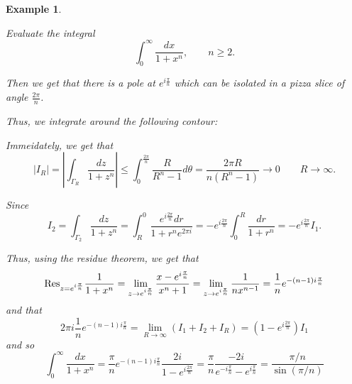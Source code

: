 \documentclass[12pt]{Qual}
\newtheorem{example}{Example}
\begin{document}
\begin{example}
$\,$
\begin{framed}
Evaluate the integral $$\int_0^\infty\frac{dx}{1+x^n},\qquad n\ge2.$$
\end{framed}

Then we get that there is a pole at $e^{i\frac{\pi}{n}}$ which can be isolated in a pizza slice of angle $\frac{2\pi}{n}$.

Thus, we integrate around the following contour:
\begin{center}
\end{center}

Immeidately, we get that $$|I_R|=\left|\int_{\Gamma_R}\frac{dz}{1+z^n}\right|\le\int_0^{\frac{2\pi}{n}}\frac{R}{R^n-1}d\theta=\frac{2\pi R}{n(R^n-1)}\to0\qquad R\to\infty.$$

Since $$I_2=\int_{\Gamma_2}\frac{dz}{1+z^n}=\int_R^0\frac{e^{i\frac{2\pi}{n}}dr}{1+r^ne^{2\pi i}}=-e^{i\frac{2\pi}{n}}\int_0^R\frac{dr}{1+r^n}=-e^{i\frac{2\pi}{n}}I_1.$$

Thus, using the residue theorem, we get that $$\text{Res}_{z=e^{i\frac{\pi}{n}}}\frac{1}{1+x^n}=\lim_{z\to e^{i\frac{\pi}{n}}}\frac{x-e^{i\frac{\pi}{n}}}{x^n+1}=\lim_{z\to e^{i\frac{\pi}{n}}}\frac{1}{nx^{n-1}}=\frac{1}{n}e^{-(n-1)i\frac{\pi}{n}}$$ and that $$2\pi i\frac{1}{n}e^{-(n-1)i\frac{\pi}{n}}=\lim_{R\to\infty}(I_1+I_2+I_R)=(1-e^{i\frac{2\pi}{n}})I_1$$ and so $$\int_0^\infty\frac{dx}{1+x^n}= \frac{\pi}{n}e^{-(n-1)i\frac{\pi}{n}}\frac{2i}{1-e^{i\frac{2\pi}{n}}}=\frac{\pi}{n}\frac{-2i}{e^{-i\frac{\pi}{n}}-e^{i\frac{\pi}{n}}}=\frac{\pi/n}{\sin(\pi/n)}$$
\end{example}
\newpage
\end{document}
